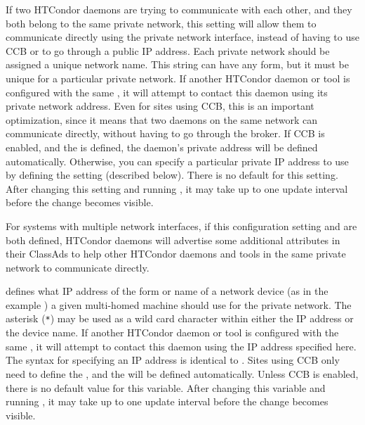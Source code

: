 \begin{description}
\label{param:PrivateNetworkName}
\item[\Macro{PRIVATE\_NETWORK\_NAME}]
  If two HTCondor daemons are trying to communicate with each other, and
  they both belong to the same private network, this setting will
  allow them to communicate directly using the private network
  interface, instead of having to use CCB or to go through a public IP address.
  Each private network should be assigned a unique network name.
  This string can have any form, but it must be unique for a
  particular private network.
  If another HTCondor daemon or tool is configured with the same
  , it will attempt to contact this
  daemon using its private network address.
  Even for sites using CCB, this is an important optimization, since
  it means that two daemons on the same network can communicate
  directly, without having to go through the broker.
  If CCB is enabled, and the  is
  defined, the daemon's private address will be defined automatically.
  Otherwise, you can specify a particular private IP address to use by
  defining the  setting
  (described below).
  There is no default for this setting.
  After changing this setting and running , it may
  take up to one  update interval before the change becomes visible.

\label{param:PrivateNetworkInterface}
\item[\Macro{PRIVATE\_NETWORK\_INTERFACE}]
  For systems with multiple network interfaces, if this configuration
  setting and  are both defined,
  HTCondor daemons will advertise some additional attributes in their
  ClassAds to help other HTCondor daemons and tools in the same private
  network to communicate directly.

   defines what IP address
  of the form  or name
  of a network device (as in the example )
  a given multi-homed machine should use for the private network.
  The asterisk (\verb|*|) may be used as a wild card character within either
  the IP address or the device name.
  If another HTCondor daemon or tool is configured with the same
  , it will attempt to contact this
  daemon using the IP address specified here.
  The syntax for specifying an IP address is identical to 
  .
  Sites using CCB only need to define
  the ,
  and the  will be defined automatically.
  Unless CCB is enabled, there is no default value for this variable.
  After changing this variable and running , 
  it may take up to one  update interval 
  before the change becomes visible.


\end{description}
